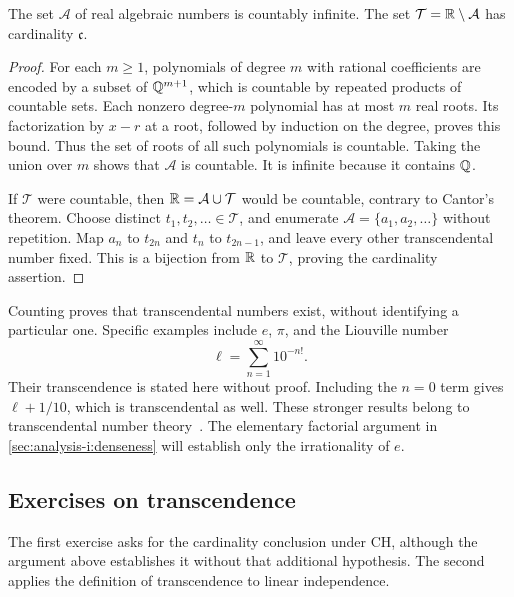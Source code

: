 \begin{proposition}
  \label{thm:analysis-i:algebraic-transcendental-cardinalities}
  The set $\mathcal A$ of real algebraic numbers is countably infinite.
  The set $\mathcal T=\mathbb{R}\setminus\mathcal A$ has cardinality $\mathfrak c$.
\end{proposition}
\begin{proof}
  For each $m\geq1$, polynomials of degree $m$ with rational coefficients
  are encoded by a subset of $\mathbb{Q}^{m+1}$, which is countable by repeated
  products of countable sets. Each nonzero degree-$m$ polynomial has at
  most $m$ real roots. Its factorization by $x-r$ at a root, followed by
  induction on the degree, proves this bound. Thus the set of roots of
  all such polynomials is countable. Taking the union over $m$ shows that
  $\mathcal A$ is countable. It is infinite because it contains $\mathbb{Q}$.

  If $\mathcal T$ were countable, then $\mathbb{R}=\mathcal A\cup\mathcal T$
  would be countable, contrary to Cantor's theorem. Choose distinct
  $t_1,t_2,\ldots\in\mathcal T$, and enumerate
  $\mathcal A=\{a_1,a_2,\ldots\}$ without repetition.
  Map $a_n$ to $t_{2n}$ and $t_n$ to $t_{2n-1}$, and leave every other
  transcendental number fixed. This is a bijection from $\mathbb{R}$ to
  $\mathcal T$, proving the cardinality assertion.
\end{proof}

Counting proves that transcendental numbers exist, without identifying a
particular one. Specific examples include $e$, $\pi$, and the Liouville number
\[
  \ell=\sum_{n=1}^{\infty}10^{-n!}.
\]
Their transcendence is stated here without proof. Including the $n=0$
term gives $\ell+1/10$, which is transcendental
as well. These stronger results belong to transcendental number theory~\cite{Waldschmidt2017}.
The elementary factorial argument in \autoref{sec:analysis-i:denseness}
will establish only the irrationality of $e$.

\subsection{Exercises on transcendence}
The first exercise asks for the cardinality conclusion under CH, although
the argument above establishes it without that additional hypothesis.
The second applies the definition of transcendence to linear independence.




